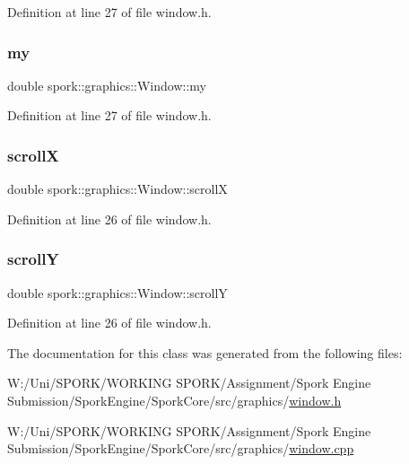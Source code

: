 Definition at line 27 of file window.\+h.

\mbox{\label{classspork_1_1graphics_1_1_window_a5fea429ed7a514e1f1d7b51a5318e34d}} 
\subsubsection{\texorpdfstring{my}{my}}
{\footnotesize\ttfamily double spork\+::graphics\+::\+Window\+::my\hspace{0.3cm}{\ttfamily [private]}}



Definition at line 27 of file window.\+h.

\mbox{\label{classspork_1_1graphics_1_1_window_a9e178f6a4378404048d26e4f560b76c8}} 
\subsubsection{\texorpdfstring{scrollX}{scrollX}}
{\footnotesize\ttfamily double spork\+::graphics\+::\+Window\+::scrollX\hspace{0.3cm}{\ttfamily [private]}}



Definition at line 26 of file window.\+h.

\mbox{\label{classspork_1_1graphics_1_1_window_a618aaab346cbb5e98f6a4b1f034ea56b}} 
\subsubsection{\texorpdfstring{scrollY}{scrollY}}
{\footnotesize\ttfamily double spork\+::graphics\+::\+Window\+::scrollY\hspace{0.3cm}{\ttfamily [private]}}



Definition at line 26 of file window.\+h.



The documentation for this class was generated from the following files\+:\begin{DoxyCompactItemize}
\item 
W\+:/\+Uni/\+S\+P\+O\+R\+K/\+W\+O\+R\+K\+I\+N\+G S\+P\+O\+R\+K/\+Assignment/\+Spork Engine Submission/\+Spork\+Engine/\+Spork\+Core/src/graphics/\hyperlink{window_8h}{window.\+h}\item 
W\+:/\+Uni/\+S\+P\+O\+R\+K/\+W\+O\+R\+K\+I\+N\+G S\+P\+O\+R\+K/\+Assignment/\+Spork Engine Submission/\+Spork\+Engine/\+Spork\+Core/src/graphics/\hyperlink{window_8cpp}{window.\+cpp}\end{DoxyCompactItemize}
